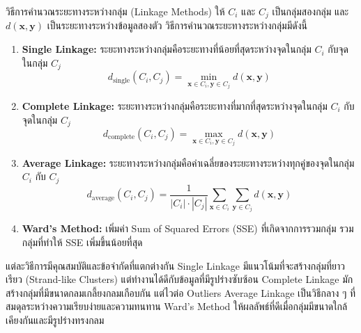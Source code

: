 \begin{myBox}[]{วิธีการคำนวณระยะทางระหว่างกลุ่ม (Linkage Methods)}{}
ให้ $C_i$ และ $C_j$ เป็นกลุ่มสองกลุ่ม และ $d(\mathbf{x}, \mathbf{y})$ เป็นระยะทางระหว่างข้อมูลสองตัว วิธีการคำนวณระยะทางระหว่างกลุ่มมีดังนี้

\begin{enumerate}
    \item \textbf{Single Linkage:} ระยะทางระหว่างกลุ่มคือระยะทางที่น้อยที่สุดระหว่างจุดในกลุ่ม $C_i$ กับจุดในกลุ่ม $C_j$
    $$d_{\text{single}}(C_i, C_j) = \min_{\mathbf{x} \in C_i, \mathbf{y} \in C_j} d(\mathbf{x}, \mathbf{y})$$

    \item \textbf{Complete Linkage:} ระยะทางระหว่างกลุ่มคือระยะทางที่มากที่สุดระหว่างจุดในกลุ่ม $C_i$ กับจุดในกลุ่ม $C_j$
    $$d_{\text{complete}}(C_i, C_j) = \max_{\mathbf{x} \in C_i, \mathbf{y} \in C_j} d(\mathbf{x}, \mathbf{y})$$

    \item \textbf{Average Linkage:} ระยะทางระหว่างกลุ่มคือค่าเฉลี่ยของระยะทางระหว่างทุกคู่ของจุดในกลุ่ม $C_i$ กับ $C_j$
    $$d_{\text{average}}(C_i, C_j) = \frac{1}{|C_i| \cdot |C_j|} \sum_{\mathbf{x} \in C_i} \sum_{\mathbf{y} \in C_j} d(\mathbf{x}, \mathbf{y})$$

    \item \textbf{Ward's Method:} เพิ่มค่า Sum of Squared Errors (SSE) ที่เกิดจากการรวมกลุ่ม รวมกลุ่มที่ทำให้ SSE เพิ่มขึ้นน้อยที่สุด
\end{enumerate}
\end{myBox}

แต่ละวิธีการมีคุณสมบัติและข้อจำกัดที่แตกต่างกัน Single Linkage มีแนวโน้มที่จะสร้างกลุ่มที่ยาวเรียว (Strand-like Clusters) แต่ทำงานได้ดีกับข้อมูลที่มีรูปร่างซับซ้อน Complete Linkage มักสร้างกลุ่มที่มีขนาดกลมเกลี้ยงกลมเกือบกัน แต่ไวต่อ Outliers Average Linkage เป็นวิธีกลาง ๆ ที่สมดุลระหว่างความเรียบง่ายและความทนทาน Ward's Method ให้ผลลัพธ์ที่ดีเมื่อกลุ่มมีขนาดใกล้เคียงกันและมีรูปร่างทรงกลม

